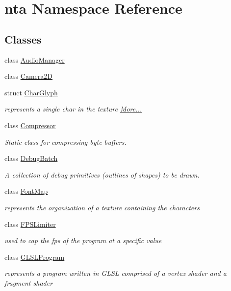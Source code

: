 \hypertarget{namespacenta}{}\section{nta Namespace Reference}
\label{namespacenta}
\subsection*{Classes}
\begin{DoxyCompactItemize}
\item 
class \hyperlink{classnta_1_1AudioManager}{Audio\+Manager}
\item 
class \hyperlink{classnta_1_1Camera2D}{Camera2D}
\item 
struct \hyperlink{namespacenta_d4/d26/structnta_1_1CharGlyph}{Char\+Glyph}
\begin{DoxyCompactList}\small\item\em represents a single char in the texture  \hyperlink{namespacenta_d4/d26/structnta_1_1CharGlyph}{More...}\end{DoxyCompactList}\item 
class \hyperlink{classnta_1_1Compressor}{Compressor}
\begin{DoxyCompactList}\small\item\em Static class for compressing byte buffers. \end{DoxyCompactList}\item 
class \hyperlink{classnta_1_1DebugBatch}{Debug\+Batch}
\begin{DoxyCompactList}\small\item\em A collection of debug primitives (outlines of shapes) to be drawn. \end{DoxyCompactList}\item 
class \hyperlink{classnta_1_1FontMap}{Font\+Map}
\begin{DoxyCompactList}\small\item\em represents the organization of a texture containing the characters \end{DoxyCompactList}\item 
class \hyperlink{classnta_1_1FPSLimiter}{F\+P\+S\+Limiter}
\begin{DoxyCompactList}\small\item\em used to cap the fps of the program at a specific value \end{DoxyCompactList}\item 
class \hyperlink{classnta_1_1GLSLProgram}{G\+L\+S\+L\+Program}
\begin{DoxyCompactList}\small\item\em represents a program written in G\+L\+SL comprised of a vertex shader and a fragment shader \end{DoxyCompactList}\item 

\end{DoxyCompactItemize}
